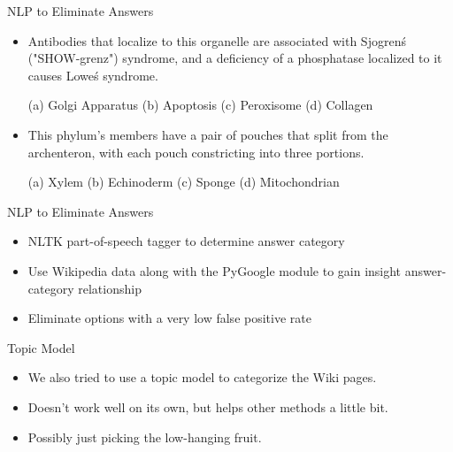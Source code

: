 \documentclass{beamer}
\begin{document}
\begin{frame}{NLP to Eliminate Answers}
   \begin{itemize}
      \item Antibodies that localize to {\color{red}this} {\color{green}organelle} are associated with Sjogren\'s ("SHOW-grenz") syndrome, and a deficiency of a phosphatase localized to it causes Lowe\'s syndrome.

	(a) {\color{green}Golgi Apparatus} (b) Apoptosis (c) {\color{green}Peroxisome} (d) Collagen

      \item {\color{red}This} {\color{green}phylum's} members have a pair of pouches that split from the archenteron, with each pouch constricting into three portions. 

	(a) Xylem (b) {\color{green}Echinoderm} (c) Sponge (d) Mitochondrian
   \end{itemize}
\end{frame}

\begin{frame}{NLP to Eliminate Answers}
   \begin{itemize}
      \item NLTK part-of-speech tagger to determine answer category
      \item Use Wikipedia data along with the PyGoogle module to gain insight answer-category relationship
      \item Eliminate options with a very low false positive rate
   \end{itemize}
\end{frame}



\begin{frame}{Topic Model}
   \begin{itemize}
      \item We also tried to use a topic model to categorize the Wiki pages.
      \item Doesn't work well on its own, but helps other methods a little bit.
      \item Possibly just picking the low-hanging fruit.
   \end{itemize}
\end{frame}
\end{document}

